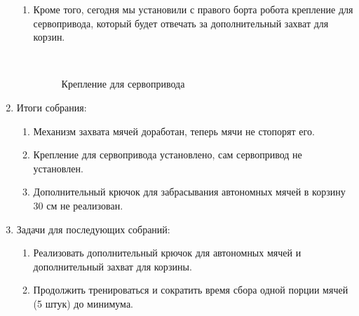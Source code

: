 \begin{enumerate}
\begin{enumerate}
		\item Кроме того, сегодня мы установили с правого борта робота крепление для сервопривода, который будет отвечать за дополнительный захват для корзин.
        \begin{figure}[H]
	  	  \begin{minipage}[h]{0.2\linewidth}
	  	    \center  
	  	  \end{minipage}
	  	  \begin{minipage}[h]{0.6\linewidth}
	  		\caption{Крепление для сервопривода}
	  	  \end{minipage}
	    \end{figure}

	\end{enumerate}
	
	\item Итоги собрания:
	\begin{enumerate}
		
		\item Механизм захвата мячей доработан, теперь мячи не стопорят его.
		
		\item Крепление для сервопривода установлено, сам сервопривод не установлен.
		
        \item Дополнительный крючок для забрасывания автономных мячей в корзину 30 см не реализован.
		
	\end{enumerate}
	
	\item Задачи для последующих собраний:
	\begin{enumerate}
		
		\item Реализовать дополнительный крючок для автономных мячей и дополнительный захват для корзины.
		
		\item Продолжить тренироваться и сократить время сбора одной порции мячей (5 штук) до минимума.
			
	\end{enumerate}
\end{enumerate}
\fillpage
